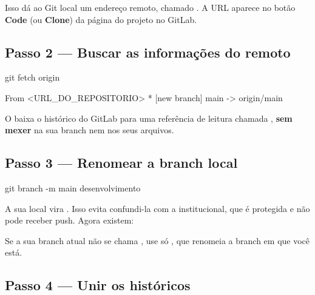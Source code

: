 Isso dá ao Git local um endereço remoto, chamado . A URL aparece no botão \textbf{Code} (ou \textbf{Clone}) da página do projeto no GitLab.

\subsection*{Passo 2 — Buscar as informações do remoto}

\begin{terminal}
git fetch origin
\end{terminal}
\begin{saida}
From <URL_DO_REPOSITORIO>
 * [new branch]      main       -> origin/main
\end{saida}

O  baixa o histórico do GitLab para uma referência de leitura chamada , \textbf{sem mexer} na sua branch nem nos seus arquivos.

\subsection*{Passo 3 — Renomear a branch local}

\begin{terminal}
git branch -m main desenvolvimento
\end{terminal}

A sua  local vira . Isso evita confundi-la com a  institucional, que é protegida e não pode receber push. Agora existem:

\begin{center}
\end{center}

\begin{dica}
Se a sua branch atual não se chama , use só , que renomeia a branch em que você está.
\end{dica}

\subsection*{Passo 4 — Unir os históricos}

